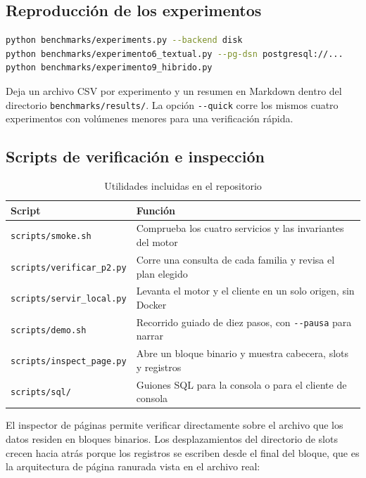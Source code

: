\documentclass[a4paper,12pt]{article}
\begin{document}
\subsection{Reproducción de los experimentos}

\begin{lstlisting}[language=bash, caption={Arnés de experimentación}]
python benchmarks/experiments.py --backend disk
python benchmarks/experimento6_textual.py --pg-dsn postgresql://...
python benchmarks/experimento9_hibrido.py
\end{lstlisting}

Deja un archivo CSV por experimento y un resumen en Markdown dentro del
directorio \texttt{benchmarks/\allowbreak results/}. La opción
\texttt{-{}-quick} corre los mismos
cuatro experimentos con volúmenes menores para una verificación rápida.

\subsection{Scripts de verificación e inspección}

\begin{table}[H]
\centering
\caption{Utilidades incluidas en el repositorio}
\begin{tabularx}{\textwidth}{@{}lX@{}}
\toprule
\textbf{Script} & \textbf{Función} \\
\midrule
\texttt{scripts/smoke.sh} & Comprueba los cuatro servicios y las invariantes del motor \\
\texttt{scripts/verificar\_p2.py} & Corre una consulta de cada familia y revisa el plan elegido \\
\texttt{scripts/servir\_local.py} & Levanta el motor y el cliente en un solo origen, sin Docker \\
\texttt{scripts/demo.sh} & Recorrido guiado de diez pasos, con \texttt{-{}-pausa} para narrar \\
\texttt{scripts/inspect\_page.py} & Abre un bloque binario y muestra cabecera, slots y registros \\
\texttt{scripts/sql/} & Guiones SQL para la consola o para el cliente de consola \\
\bottomrule
\end{tabularx}
\end{table}

El inspector de páginas permite verificar directamente sobre el archivo que los
datos residen en bloques binarios. Los desplazamientos del directorio de slots
crecen hacia atrás porque los registros se escriben desde el final del bloque,
que es la arquitectura de página ranurada vista en el archivo real:
\end{document}
